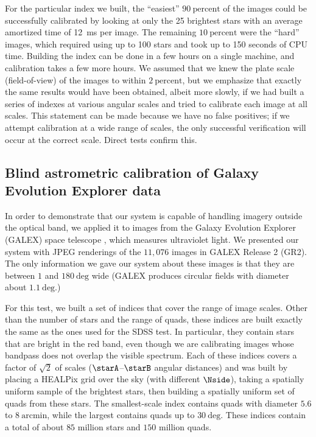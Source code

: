 \documentclass[12pt,preprint]{aastex}
\newcommand{\unit}[1]{\mathrm{#1}}
\newcommand{\percent}{\unit{percent}}
\renewcommand{\%}{\percent}
\renewcommand{\arcmin}{\unit{arcmin}}
\renewcommand{\deg}{\unit{deg}}
\begin{document}
For the particular index we built, the ``easiest'' $90~\percent$ of
the images could be successfully calibrated by looking at only the 25
brightest stars with an average amortized time of 12~ms per image.
The remaining $10~\percent$ were the ``hard'' images, which required
using up to 100 stars and took up to 150 seconds of CPU time.
Building the index can be done in a few hours on a single machine, and
calibration takes a few more hours.  We assumed that we knew the plate
scale (field-of-view) of the images to within $2~\percent$, but we
emphasize that exactly the same results would have been obtained,
albeit more slowly, if we had built a series of indexes at various
angular scales and tried to calibrate each image at all scales.  This
statement can be made because we have no false positives; if we
attempt calibration at a wide range of scales, the only successful
verification will occur at the correct scale.  Direct tests confirm
this.

\subsection{Blind astrometric calibration of Galaxy Evolution Explorer data}


In order to demonstrate that our system is capable of handling imagery
outside the optical band, we applied it to images from the Galaxy
Evolution Explorer (GALEX) space telescope \citep{galex}, which
measures ultraviolet light.  We presented our system with JPEG
renderings of the $11,076$ images in GALEX Release 2 (GR2).  The only
information we gave our system about these images is that they are
between $1$ and $180~\deg$ wide (GALEX produces circular fields
with diameter about $1.1~\deg$.)

For this test, we built a set of indices that cover the range of image
scales.  Other than the number of stars and the range of quads, these
indices are built exactly the same as the ones used for the SDSS test.
In particular, they contain stars that are bright in the red band,
even though we are calibrating images whose bandpass does not overlap
the visible spectrum.  Each of these indices covers a factor of
$\sqrt{2}$ of scales ($\starA$--$\starB$ angular distances)
and was built by placing a HEALPix grid over the
sky (with different $\Nside$), taking a spatially uniform sample of
the brightest stars, then building a spatially uniform set of quads
from these stars.  The smallest-scale index contains quads with
diameter $5.6$ to $8~\arcmin$, while the largest contains quads up
to $30~\deg$.  These indices contain a total of about $85$
million stars and $150$ million quads.
\end{document}
